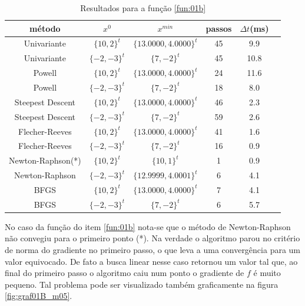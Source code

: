 \documentclass[10pt, a4paper]{article}
\begin{document}
\begin{table}[H]
      \small
      \centering
      \caption{Resultados para a fun\c c\~ao \ref{fun:01b}}
      \begin{tabular}{c|c|c|c|c|c}
            m\'etodo           & $x^0$ & $x^{min}$ & passos & $\Delta t$(ms) \\
            \hline
            Univariante         & $\{10,2\}^t$    & $\{13.0000,4.0000\}^t$  & 45 & 9.9 \\
            Univariante         & $\{-2,-3\}^t$   & $\{7,-2\}^t$  & 45 & 10.8 \\
            \hline
            Powell              & $\{10,2\}^t$    & $\{13.0000,4.0000\}^t$  & 24 & 11.6 \\
            Powell              & $\{-2,-3\}^t$   & $\{7,-2\}^t$  & 18 & 8.0 \\
            \hline
            Steepest Descent    & $\{10,2\}^t$    & $\{13.0000,4.0000\}^t$  & 46 & 2.3 \\
            Steepest Descent    & $\{-2,-3\}^t$   & $\{7,-2\}^t$  & 59 & 2.6 \\
            \hline
            Flecher-Reeves     & $\{10,2\}^t$    & $\{13.0000,4.0000\}^t$  & 41 & 1.6 \\
            Flecher-Reeves     & $\{-2,-3\}^t$   & $\{7,-2\}^t$  & 16 & 0.9 \\
            \hline
            Newton-Raphson(*)   & $\{10,2\}^t$    & $\{10,1\}^t$  &  1 & 0.9 \\
            Newton-Raphson     & $\{-2,-3\}^t$   & $\{12.9999,4.0001\}^t$  &  6 & 4.1 \\
            \hline
            BFGS                & $\{10,2\}^t$    & $\{13.0000,4.0000\}^t$  &  7 & 4.1 \\
            BFGS                & $\{-2,-3\}^t$   & $\{7,-2\}^t$  &  6 & 5.7 \\
      \end{tabular}
      \label{table:resultadosf1b}
\end{table}

No caso da fun\c c\~ao do item \ref{fun:01b} nota-se que o m\'etodo de Newton-Raphson n\~ao convegiu para o primeiro ponto (*). Na verdade o algoritmo parou no crit\'erio de norma do gradiente no primeiro passo, o que leva a uma converg\^encia para um valor equivocado. De fato a busca linear nesse caso retornou um valor tal que, ao final do primeiro passo o algoritmo caiu num ponto o gradiente de $f$ \'e muito pequeno. Tal problema pode ser visualizado tamb\'em graficamente na figura \ref{fig:graf01B_m05}.
\end{document}
